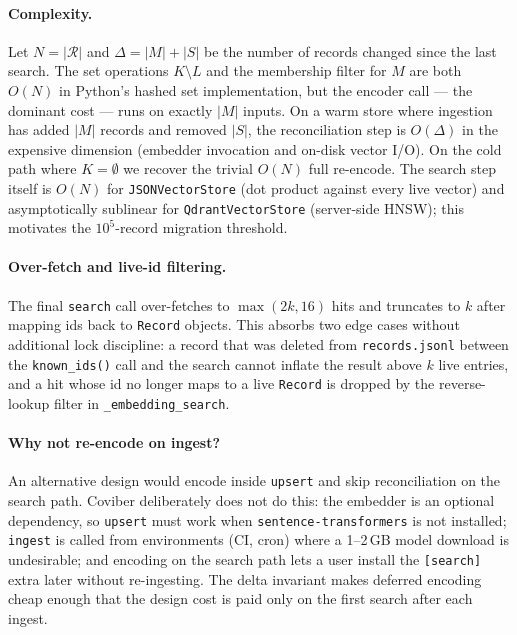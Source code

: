 \paragraph{Complexity.}
Let $N = |\mathcal{R}|$ and $\Delta = |M| + |S|$ be the number of
records changed since the last search. The set operations
$K \setminus L$ and the membership filter for $M$ are both $O(N)$ in
Python's hashed set implementation, but the encoder call — the
dominant cost — runs on exactly $|M|$ inputs. On a warm store where
ingestion has added $|M|$ records and removed $|S|$, the reconciliation
step is $O(\Delta)$ in the expensive dimension (embedder invocation and
on-disk vector I/O). On the cold path where $K = \emptyset$ we
recover the trivial $O(N)$ full re-encode. The search step itself is
$O(N)$ for \texttt{JSONVectorStore} (dot product against every live
vector) and asymptotically sublinear for
\texttt{QdrantVectorStore} (server-side HNSW\cite{TODO-hnsw}); this
motivates the $10^{5}$-record migration threshold.

\paragraph{Over-fetch and live-id filtering.}
The final \texttt{search} call over-fetches to $\max(2k, 16)$ hits and
truncates to $k$ after mapping ids back to \texttt{Record} objects.
This absorbs two edge cases without additional lock discipline:
a record that was deleted from \texttt{records.jsonl} between the
\texttt{known\_ids()} call and the search cannot inflate the result
above $k$ live entries, and a hit whose id no longer maps to a live
\texttt{Record} is dropped by the reverse-lookup filter in
\texttt{\_embedding\_search}.

\paragraph{Why not re-encode on ingest?}
An alternative design would encode inside \texttt{upsert} and skip
reconciliation on the search path. Coviber deliberately does not do
this: the embedder is an optional dependency, so \texttt{upsert} must
work when \texttt{sentence-transformers} is not installed;
\texttt{ingest} is called from environments (CI, cron) where a
1--2\,GB model download is undesirable; and encoding on the search
path lets a user install the \texttt{[search]} extra later without
re-ingesting. The delta invariant makes deferred encoding cheap
enough that the design cost is paid only on the first search after
each ingest.

